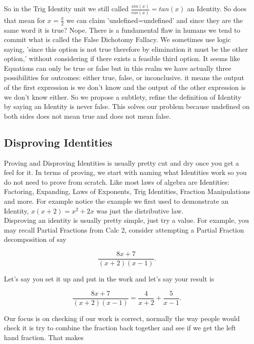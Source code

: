 \documentclass[12pt]{article}
\begin{document}
So in the Trig Identity unit we still called $\frac{sin(x)}{cos(x)}=tan(x)$ an Identity. So does that mean for $x=\frac{\pi}{2}$ we can claim 'undefined=undefined' and since they are the same word it is true? Nope. There is a fundamental flaw in humans we tend to commit what is called the False Dichotomy Fallacy. We sometimes use logic saying, 'since this option is not true therefore by elimination it must be the other option,' without considering if there exists a feasible third option. It seems like Equations can only be true or false but in this realm we have actually three possibilities for outcomes: either true, false, or inconclusive. it means the output of the first expression is we don't know and the output of the other expression is we don't know either. So we propose a subtlety, refine the definition of Identity by saying an Identity is never false. This solves our problem because undefined on both sides does not mean true and does not mean false.

\subsection{Disproving Identities}

Proving and Disproving Identities is usually pretty cut and dry once you get a feel for it. In terms of proving, we start with naming what Identities work so you do not need to prove from scratch. Like most laws of algebra are Identities: Factoring, Expanding, Laws of Exponents, Trig Identities, Fraction Manipulations and more. For example notice the example we first used to demonstrate an Identity, $x(x+2)=x^2+2x$ was just the distributive law. \\

Disproving an identity is usually pretty simple, just try a value. For example, you may recall Partial Fractions from Calc 2, consider attempting a Partial Fraction decomposition of say

\begin{equation*}
    \frac{8x+7}{(x+2)(x-1)}.
\end{equation*}

Let's say you set it up and put in the work and let's say your result is

\begin{equation*}
    \frac{8x+7}{(x+2)(x-1)}=\frac{4}{x+2}+\frac{5}{x-1}.
\end{equation*}

Our focus is on checking if our work is correct, normally the way people would check it is try to combine the fraction back together and see if we get the left hand fraction. That makes
\end{document}
